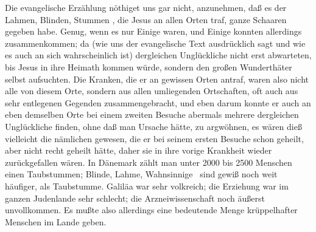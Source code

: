 \begin{aufza}
\begin{aufzb}
\item[\RWbet{Antwort.}] Die evangelische Erzählung nöthiget uns gar nicht, anzunehmen, daß es der Lahmen, Blinden, Stummen \usw , die Jesus an allen Orten traf, ganze Schaaren gegeben habe. Genug, wenn es nur Einige waren, und Einige konnten allerdings zusammenkommen; da (wie uns der evangelische Text ausdrücklich sagt und wie es auch an sich wahrscheinlich ist) dergleichen Unglückliche nicht erst abwarteten, bis Jesus in ihre Heimath kommen würde, sondern den großen Wunderthäter selbst aufsuchten. Die Kranken, die er an gewissen Orten antraf, waren also nicht alle von diesem Orte, sondern aus allen umliegenden Ortschaften, oft auch aus sehr entlegenen Gegenden zusammengebracht, und eben darum konnte er auch an eben demselben Orte bei einem zweiten Besuche abermals mehrere dergleichen Unglückliche finden, ohne daß man Ursache hätte, zu argwöhnen, es wären dieß vielleicht die nämlichen gewesen, die er bei seinem ersten Besuche schon geheilt, aber nicht recht geheilt hätte, daher sie in ihre vorige Krankheit wieder zurückgefallen wären. In Dänemark zählt man unter 2000 bis 2500 Menschen einen Taubstummen; Blinde, Lahme, Wahnsinnige \udgl\  sind gewiß noch weit häufiger, als Taubstumme. Galiläa war sehr volkreich; die Erziehung war im ganzen Judenlande sehr schlecht; die Arzneiwissenschaft noch äußerst unvollkommen. Es mußte also allerdings eine bedeutende Menge krüppelhafter Menschen im Lande geben.
\end{aufzb}
\end{aufza}\par

\begin{center}\end{center}

